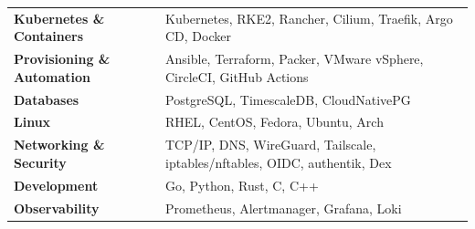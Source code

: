 \begin{tabularx}{\textwidth}{@{}lX@{}}
\textbf{Kubernetes \& Containers} &
    Kubernetes, RKE2, Rancher, Cilium, Traefik, Argo CD, Docker \\

\textbf{Provisioning \& Automation} &
    Ansible, Terraform, Packer, VMware vSphere, CircleCI, GitHub Actions \\

\textbf{Databases} &
    PostgreSQL, TimescaleDB, CloudNativePG \\

\textbf{Linux} &
    RHEL, CentOS, Fedora, Ubuntu, Arch \\

\textbf{Networking \& Security} &
    TCP/IP, DNS, WireGuard, Tailscale, iptables/nftables, OIDC, authentik, Dex \\

\textbf{Development} &
    Go, Python, Rust, C, C++ \\

\textbf{Observability} &
    Prometheus, Alertmanager, Grafana, Loki \\
\end{tabularx}
